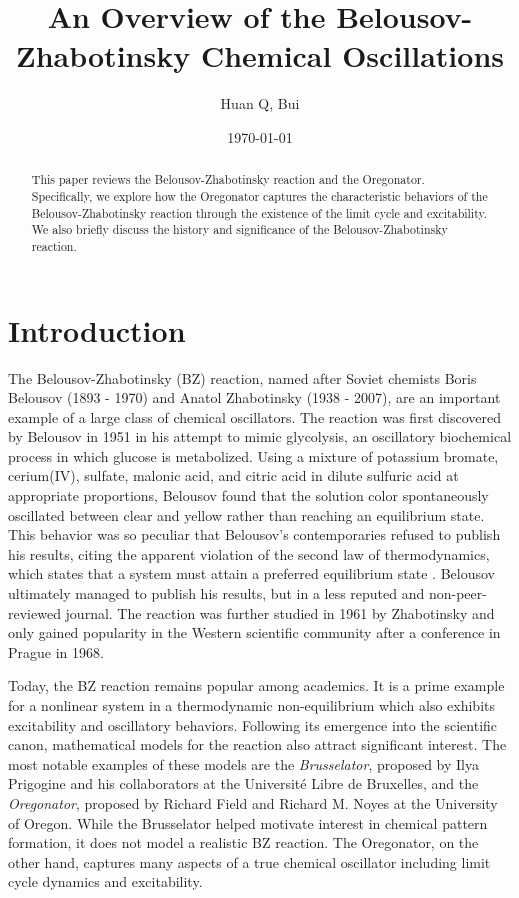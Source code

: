 \documentclass[twocolumn,amsmath,amssymb,aps]{revtex4}
\begin{document}
\title{An Overview of the Belousov-Zhabotinsky Chemical Oscillations}%
\author{Huan Q, Bui}
\date{\today}
\begin{abstract}
This paper reviews the Belousov-Zhabotinsky reaction and the Oregonator. Specifically, we explore how the Oregonator captures the characteristic behaviors of the Belousov-Zhabotinsky reaction through the existence of the limit cycle and excitability. We also briefly discuss the history and significance of the Belousov-Zhabotinsky reaction. 
\end{abstract}
\maketitle




\section{Introduction}
The Belousov-Zhabotinsky (BZ) reaction, named after Soviet chemists Boris Belousov (1893 - 1970) and Anatol Zhabotinsky (1938 - 2007), are an important example of a large class of chemical oscillators. The reaction was first discovered by Belousov in 1951 in his attempt to mimic glycolysis, an oscillatory biochemical process in which glucose is metabolized. Using a mixture of potassium bromate, cerium(IV), sulfate, malonic acid, and citric acid in dilute sulfuric acid at appropriate proportions, Belousov found that the solution color spontaneously oscillated between clear and yellow rather than reaching an equilibrium state. This behavior was so peculiar that Belousov's contemporaries refused to publish his results, citing the apparent violation of the second law of thermodynamics, which states that a system must attain a preferred equilibrium state \cite{ball1999self}. Belousov ultimately managed to publish his results, but in a less reputed and non-peer-reviewed journal. The reaction was further studied in 1961 by Zhabotinsky and only gained popularity in the Western scientific community after a conference in Prague in 1968\cite{doi:10.1021/ed061p661}.

Today, the BZ reaction remains popular among academics. It is a prime example for a nonlinear system in a thermodynamic  non-equilibrium which also exhibits excitability and oscillatory behaviors. Following its emergence into the scientific canon, mathematical models for the reaction also attract significant interest. The most notable examples of these models are the \textit{Brusselator}, proposed by Ilya Prigogine and his collaborators at the Université Libre de Bruxelles, and the \textit{Oregonator}, proposed by Richard Field and Richard M. Noyes at the University of Oregon. While the Brusselator helped motivate interest in chemical pattern formation, it does not model a realistic BZ reaction. The Oregonator, on the other hand, captures many aspects of a true chemical oscillator including limit cycle dynamics and excitability.
\end{document}
